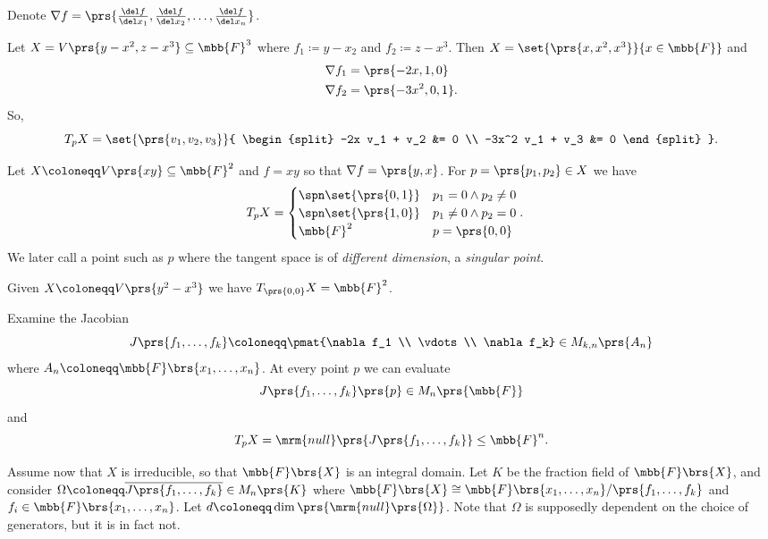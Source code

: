 \documentclass[10pt,a4paper,twoside,openany,hidelinks]{book}
\begin{document}
\begin{notation}
Denote $\nabla f = \prs{\frac{\del f}{\del x_1}, \frac{\del f}{\del x_2}, \ldots, \frac{\del f}{\del x_n}}$.
\end{notation}

\begin{example}
Let $X = V\prs{y - x^2, z - x^3} \subseteq \mbb{F}^3$ where $f_1 \coloneqq y - x_2$ and $f_2 \coloneqq z - x^3$.
Then $X = \set{\prs{x,x^2,x^3}}{x \in \mbb{F}}$ and
\begin{align*}
\nabla f_1 &= \prs{-2x, 1, 0} \\
\nabla f_2 &= \prs{-3x^2, 0, 1} \text{.}
\end{align*}
So,
\[T_p X = \set{\prs{v_1, v_2, v_3}}{
\begin{split}
-2x v_1 + v_2 &= 0 \\ -3x^2 v_1 + v_3 &= 0
\end{split}
} \text{.}\]
\end{example}

\begin{example}
Let $X \coloneqq V\prs{xy} \subseteq \mbb{F}^2$ and $f = xy$ so that $\nabla f = \prs{y,x}$.
For $p = \prs{p_1, p_2} \in X$ we have
\begin{align*}
T_p X &=
\begin{cases}
\spn\set{\prs{0,1}} & p_1 = 0 \wedge p_2 \neq 0 \\
\spn\set{\prs{1,0}} & p_1 \neq 0 \wedge p_2 = 0 \\
\mbb{F}^2 & p = \prs{0,0}
\end{cases} \text{.}
\end{align*}
We later call a point such as $p$ where the tangent space is of \emph{different dimension}, a \emph{singular point}.
\end{example}

\begin{example}
Given $X \coloneqq V\prs{y^2 - x^3}$ we have $T_{\prs{0,0}}X = \mbb{F}^2$.
\end{example}

Examine the Jacobian
\[J\prs{f_1, \ldots, f_k} \coloneqq \pmat{\nabla f_1 \\ \vdots \\ \nabla f_k} \in M_{k,n}\prs{A_n}\]
where $A_n \coloneqq \mbb{F}\brs{x_1, \ldots, x_n}$.
At every point $p$ we can evaluate
\[J\prs{f_1, \ldots, f_k}\prs{p} \in M_n\prs{\mbb{F}}\]
and
\[T_p X = \mrm{null}\prs{J\prs{f_1, \ldots, f_k}} \leq \mbb{F}^n \text{.}\]

Assume now that $X$ is irreducible, so that $\mbb{F}\brs{X}$ is an integral domain. Let $K$ be the fraction field of $\mbb{F}\brs{X}$, and consider $\Omega \coloneqq \overline{J\prs{f_1, \ldots, f_k}} \in M_n\prs{K}$ where $\mbb{F}\brs{X} \cong \mbb{F}\brs{x_1, \ldots, x_n}/\prs{f_1, \ldots, f_k}$ and $f_i \in \mbb{F}\brs{x_1, \ldots, x_n}$. Let $d \coloneqq \dim\prs{\mrm{null}\prs{\Omega}}$. Note that $\Omega$ is supposedly dependent on the choice of generators, but it is in fact not.
\end{document}
